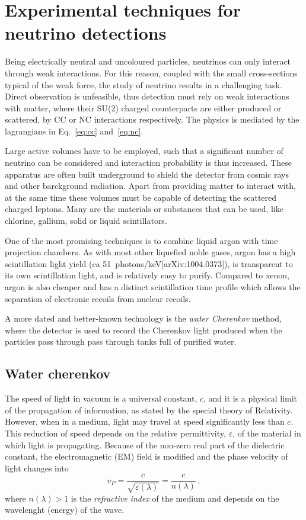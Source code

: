 \chapter{Experimental techniques for neutrino detections}


Being electrically neutral and uncoloured particles, neutrinos can only interact through weak interactions.
For this reason, coupled with the small cross-sections typical of the weak force, the study of neutrino results %
in a challenging task.
Direct observation is unfeasible, thus detection must rely on weak interactions with matter, where %
their SU(2) charged counterparts are either produced or scattered, by CC or NC interactions respectively.
The physics is mediated by the lagrangians in Eq.~\ref{eq:cc} and~\ref{eq:nc}.

Large active volumes have to be employed, such that a significant number of neutrino can be considered and %
interaction probability is thus increased.
These apparatus are often built underground to shield the detector from cosmic rays and other barckground radiation.
Apart from providing matter to interact with, at the same time these volumes must be capable of detecting %
the scattered charged leptons.
Many are the materials or substances that can be used, like chlorine, gallium, solid or liquid scintillators.

One of the most promising techniques is to combine liquid argon with time projection chambers.
As with most other liquefied noble gases, argon has a high scintillation light yield %
(ca 51~photons/keV[arXiv:1004.0373]), is transparent to its own scintillation light, and is relatively easy to purify.
Compared to xenon, argon is also cheaper and has a distinct scintillation time profile which allows the separation %
of electronic recoils from nuclear recoils.

A more dated and better-known technology is the \emph{water Cherenkov} method, where the detector is used to %
record the Cherenkov light produced when the particles pass through pass through tanks full of purified water. 

\section{Water cherenkov}
\label{sec:wch}

The speed of light in vacuum is a universal constant, $c$, and it is a physical limit of the propagation %
of information, as stated by the special theory of Relativity.
However, when in a medium, light may travel at speed significantly less than $c$.
This reduction of speed depends on the relative permittivity, $\varepsilon$, of the material in which light is %
propagating.
Because of the non-zero real part of the dielectric constant, the electromagnetic (EM) field is modified and %
the phase velocity of light changes into
\begin{equation}
	\label{eq:light}
	v_P = \frac{c}{\sqrt{\varepsilon(\lambda)}} = \frac{c}{n(\lambda)}\,,
\end{equation}
where $n(\lambda) > 1$ is the \emph{refractive index} of the medium and %
depends on the wavelenght (energy) of the wave.


